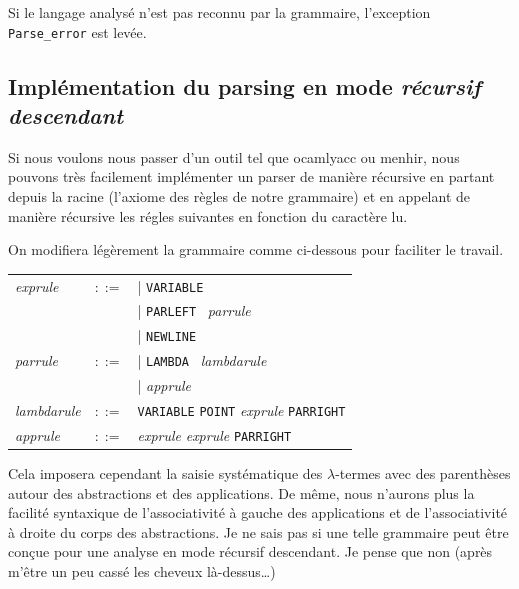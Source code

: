 \documentclass[11pt]{book}
\begin{document}
 Si le langage analysé n'est pas reconnu par la grammaire, l'exception \verb+Parse_error+ est levée.
 \subsection{Implémentation du parsing en mode \textit{récursif descendant}}
 
 Si nous voulons nous passer d'un outil tel que ocamlyacc ou menhir, nous pouvons très facilement implémenter un parser
 de manière récursive en partant depuis la racine (l'axiome des règles de notre grammaire) et en appelant de manière récursive les
 régles suivantes en fonction du caractère lu.
 
 On modifiera légèrement la grammaire comme ci-dessous pour faciliter le travail.
 
 
\vspace{0.5cm}
\begin{tabular}{lll}
\textit{exprule} & $::=$ & | \verb+VARIABLE+  \\
					  &	    & | \verb+PARLEFT+ \  \textit{parrule} \\
					  & 		 & | \verb+NEWLINE+ \\
\textit{parrule} & $::=$ & | \verb+LAMBDA+ \ \textit{lambdarule}  \\
					  &       & | \textit{apprule} \\ 
\textit{lambdarule} & $::=$ & \verb+VARIABLE+  \verb+POINT+  \textit{exprule}  \verb+PARRIGHT+ \\
\textit{apprule} & $::=$    &  \textit{exprule} \textit{exprule}  \verb+PARRIGHT+ \\
\end{tabular}
\vspace{0.5cm}

Cela imposera cependant la saisie systématique des $\lambda$-termes avec des parenthèses autour des abstractions et des applications.
De même, nous n'aurons plus la facilité syntaxique de l'associativité à gauche des applications et de l'associativité à droite
du corps des abstractions.
Je ne sais pas si une telle grammaire peut être conçue pour une analyse en mode
récursif descendant.
Je pense que non (après m'être un peu cassé les cheveux là-dessus\ldots)
\end{document}
